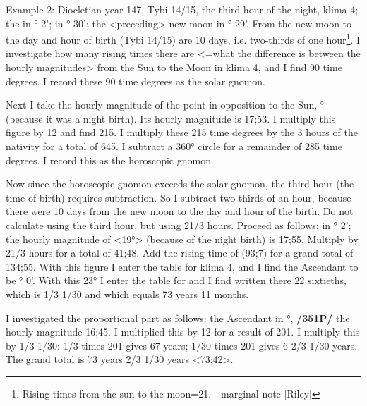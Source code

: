 Example 2: Diocletian year 147, Tybi 14/15, the third hour of the night, klima 4; the \Sun\xspace in \Capricorn\xspace 19° 2'; \Moon\xspace in \Taurus\xspace 23° 30'; the <preceding> new moon in \Capricorn\xspace 9° 29'. From the new moon to the day and hour of birth (Tybi 14/15) are 10 days, i.e. two-thirds of one hour\footnote{Rising times from the sun to the moon=21. - marginal note [Riley]}. I investigate how many rising times there are <=what the difference is between the hourly magnitudes> from the Sun to the Moon in klima 4, and I find 90 time degrees. I record these 90 time degrees as the solar gnomon. 

Next I take the hourly magnitude of the point in opposition to the Sun, \Cancer\xspace 19° (because it was a night birth). Its hourly magnitude is 17;53. I multiply this figure by 12 and find 215. I multiply these 215 time degrees by the 3 hours of the nativity for a total of 645. I subtract a 360° circle for a remainder of 285 time degrees. I record this as the horoscopic gnomon. 

Now since the horoscopic gnomon exceeds the solar gnomon, the
third hour (the time of birth) requires subtraction. So I subtract two-thirds of an hour, because there were 10 days from the new moon to the day and hour of the birth. Do not calculate using the third hour, but
using 21/3 hours. Proceed as follows: \Sun\xspace in \Capricorn\xspace 19° 2'; the hourly magnitude of \Cancer\xspace <19°> (because of the night birth) is 17;55. Multiply by 21/3 hours for a total of 41;48. Add the rising time of \Cancer\xspace (93;7) for a grand total of 134;55. With this figure I enter the table for klima 4, and I find the Ascendant to be \Leo\xspace 23° 0'. With this 23° I enter the table for \Leo\xspace and I find written there 22 sixtieths, which is 1/3 1/30 and which equals 73 years 11 months. 

I investigated the proportional part as follows: the Ascendant in \Leo\xspace 23°, \textbf{/351P/} the hourly magnitude 16;45. I multiplied this by 12 for a result of 201. I multiply this by 1/3 1/30: 1/3 times 201 gives 67 years; 1/30 times 201 gives 6 2/3 1/30 years. The
grand total is 73 years 2/3 1/30 years <73;42>.

